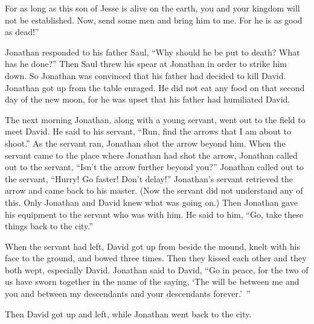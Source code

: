 {For
as long
as this
son
of Jesse
is alive
on
the earth,
you
and your kingdom
will not
be established.
Now,
send
some men
and bring
him to
me. For
he is
as good as dead!”
\par }{\PP {}Jonathan
responded
to his father
Saul,
“Why
should he be put to death? What
has he done?”
Then
Saul
threw
his spear
at Jonathan in order to strike
him down. So Jonathan
was convinced
that
his father
had decided to kill
David.
Jonathan
got
up from the table
enraged.
He did not
eat
any food
on that second
day
of the new moon,
for
he was upset
that
his father
had
humiliated
David.
\par }{\PP {}The next
morning
Jonathan,
along with
a young
servant,
went out
to the field
to meet
David.
He said
to his servant,
“Run,
find
the arrows
that
I am
about to shoot.”
As the servant
ran,
Jonathan shot
the arrow
beyond him.
When the servant
came
to
the place
where
Jonathan
had shot
the arrow,
Jonathan
called out
to
the servant,
“Isn’t
the arrow
further beyond you?”
Jonathan
called
out to the servant,
“Hurry! Go faster! Don’t
delay!” Jonathan’s
servant
retrieved
the arrow
and came
back to
his master.
(Now the servant
did not
understand
any
of this.
Only
Jonathan
and David
knew
what was going on.)
Then Jonathan
gave
his equipment
to
the servant
who
was with him. He said
to him, “Go,
take these things back
to the city.”
\par }{\PP {}When
the servant
had left, David
got up
from beside
the mound,
knelt
with his face
to the ground,
and bowed
three
times.
Then they kissed
each
other
and they both wept,
especially
David.
Jonathan
said
to David,
“Go
in peace,
for the two
of us
have
sworn
together in the name
of the {}
saying,
‘The
{}
will be
between
me and you and between
my descendants
and your descendants
forever.’ ”

\par }{\PP Then David got up and left, while Jonathan went back to the city.

}
